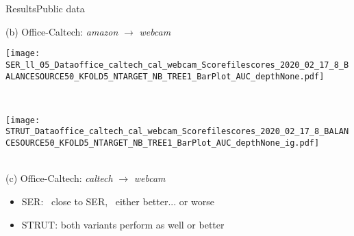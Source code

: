 \begin{frame}{Results}{Public data}
\begin{minipage}[t]{0.33\linewidth}
            \medskip
            {\small(b)\; Office-Caltech: \emph{amazon} $\rightarrow$ \emph{webcam}}
        \end{minipage}\hfill
        \begin{minipage}[t]{0.329\linewidth}\vspace{0pt}
            \centering
            \begin{minipage}[t]{\ratio\linewidth}\vspace{0pt}
            \centerline{\texttt{[image: SER\_ll\_05\_Dataoffice\_caltech\_cal\_webcam\_Scorefilescores\_2020\_02\_17\_8\_BALANCESOURCE50\_KFOLD5\_NTARGET\_NB\_TREE1\_BarPlot\_AUC\_depthNone.pdf]}}
            \end{minipage}\\
            \begin{minipage}[t]{\ratio\linewidth}\vspace{0cm}
            \centerline{\texttt{[image: STRUT\_Dataoffice\_caltech\_cal\_webcam\_Scorefilescores\_2020\_02\_17\_8\_BALANCESOURCE50\_KFOLD5\_NTARGET\_NB\_TREE1\_BarPlot\_AUC\_depthNone\_ig.pdf]}}
            \end{minipage}\\
            \medskip
            {\small(c)\; Office-Caltech: \emph{caltech} $\rightarrow$ \emph{webcam}}
        \end{minipage}
    
\begin{itemize}
    \item SER: \serll\ close to SER, \serr\ either better... or worse
    \item STRUT: both variants perform as well or better
\end{itemize}
\end{frame}

